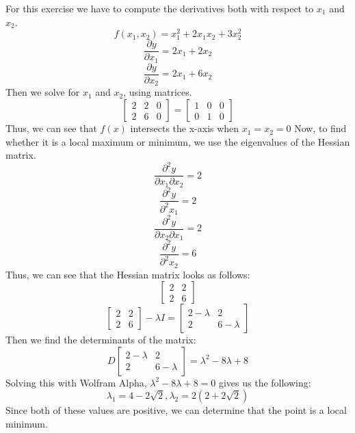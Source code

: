 For this exercise we have to compute the derivatives both with respect to $x_1$ and $x_2$.
$$f(x_1,x_2) = x_1^2+2x_1x_2+3x_2^2$$
$$\frac{\partial y}{\partial x_1} = 2x_1+2x_2$$
$$\frac{\partial y}{\partial x_2} = 2x_1+6x_2$$
Then we solve for $x_1$ and $x_2$, using matrices.
$$
\left[
\begin{array}{rr|r}
2 & 2 & 0\\
2 & 6 & 0
\end{array}
\right]
=
\left[
\begin{array}{rr|r}
1 & 0 & 0\\
0 & 1 & 0
\end{array}
\right]
$$
Thus, we can see that $f(x)$ intersects the x-axis when $x_1=x_2=0$
Now, to find whether it is a local maximum or minimum, we use the eigenvalues of the Hessian matrix.
$$\frac{\partial^2 y}{\partial x_1 \partial x_2} = 2$$
$$\frac{\partial^2 y}{\partial^2 x_1} = 2$$
$$\frac{\partial^2 y}{\partial x_2 \partial x_1} = 2$$
$$\frac{\partial^2 y}{\partial^2 x_2} = 6$$
Thus, we can see that the Hessian matrix looks as follows:
$$
\left[
\begin{array}{rr}
2 & 2\\
2 & 6
\end{array}
\right]
$$
$$
\left[
\begin{array}{rr}
2 & 2\\
2 & 6
\end{array}
\right]
-\lambda I
=
\left[
\begin{array}{rr}
2-\lambda & 2\\
2 & 6-\lambda
\end{array}
\right]
$$
Then we find the determinants of the matrix:
$$
D
\left[
\begin{array}{rr}
2-\lambda & 2\\
2 & 6-\lambda
\end{array}
\right]
= \lambda^2 -8\lambda+8
$$
Solving this with Wolfram Alpha, $\lambda^2 -8\lambda+8 = 0$ gives us the following:
$$\lambda_1 = 4-2\sqrt{2}, \lambda_2 = 2(2+2\sqrt{2})$$
Since both of these values are positive, we can determine that the point is a local minimum.